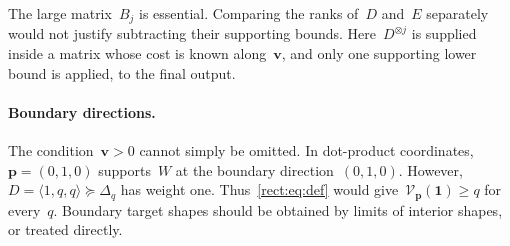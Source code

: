 \documentclass[11pt,letterpaper]{article}
\theoremstyle{definition}
\numberwithin{equation}{section}
\newcommand{\res}{\succeq}
\begin{document}
The large matrix~$B_j$ is essential. Comparing the ranks of~$D$ and~$E$ separately would not justify subtracting their supporting bounds. Here~$D^{\otimes j}$ is supplied inside a matrix whose cost is known along~$\mathbf v$, and only one supporting lower bound is applied, to the final output.

\paragraph{Boundary directions.}
The condition~$\mathbf v>0$ cannot simply be omitted. In dot-product coordinates, $\mathbf p=(0,1,0)$ supports~$W$ at the boundary direction~$(0,1,0)$. However, $D=\langle1,q,q\rangle\res\Delta_q$ has weight one. Thus~\eqref{rect:eq:def} would give~$\mathcal V_{\mathbf p}(\mathbf1)\geq q$ for every~$q$. Boundary target shapes should be obtained by limits of interior shapes, or treated directly.
\end{document}
